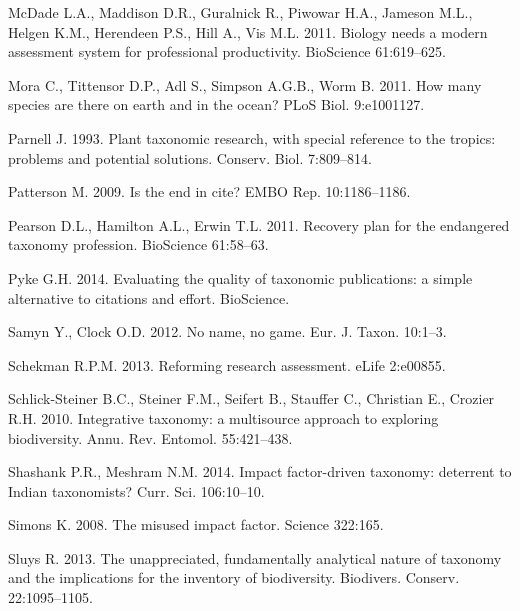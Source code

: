 \documentclass[webpdf,PV,mynatbib,surname,CE,MSC]{SYS-PV}
\begin{document}
\begin{thebibliography}{}
McDade L.A., Maddison D.R., Guralnick R., Piwowar H.A., Jameson M.L., Helgen K.M., Herendeen P.S.,
Hill A., Vis M.L. 2011. Biology needs a modern assessment system for professional productivity.
BioScience 61:619--625.

Mora C., Tittensor D.P., Adl S., Simpson A.G.B., Worm B. 2011. How many species are there on earth
and in the ocean? PLoS Biol. 9:e1001127.

Parnell J. 1993. Plant taxonomic research, with special reference to the tropics: problems and
potential solutions. Conserv. Biol. 7:809--814.

Patterson M. 2009. Is the end in cite? EMBO Rep. 10:1186--1186.

Pearson D.L., Hamilton A.L., Erwin T.L. 2011. Recovery plan for the endangered taxonomy
profession. BioScience 61:58--63.

Pyke G.H. 2014. Evaluating the quality of taxonomic publications: a simple alternative to
citations and effort. BioScience.

Samyn Y., Clock O.D. 2012. No name, no game. Eur. J. Taxon. 10:1--3.

Schekman R.P.M. 2013. Reforming research assessment. eLife 2:e00855.

Schlick-Steiner B.C., Steiner F.M., Seifert B., Stauffer C., Christian E., Crozier R.H. 2010.
Integrative taxonomy: a multisource approach to exploring biodiversity. Annu. Rev. Entomol.
55:421--438.

Shashank P.R., Meshram N.M. 2014. Impact factor-driven taxonomy: deterrent to Indian taxonomists?
Curr. Sci. 106:10--10.

Simons K. 2008. The misused impact factor. Science 322:165.

Sluys R. 2013. The unappreciated, fundamentally analytical nature of taxonomy and the implications
for the inventory of biodiversity. Biodivers. Conserv. 22:1095--1105.


\end{thebibliography}
\end{document}
